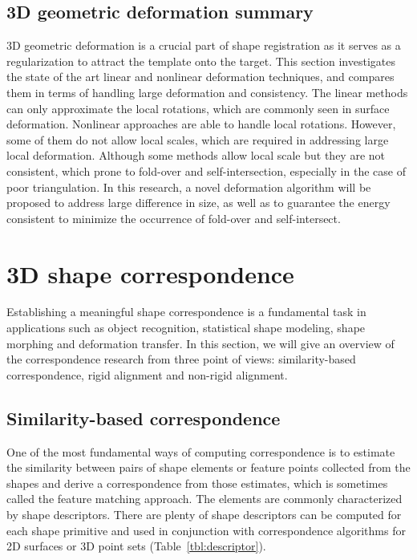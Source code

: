 \subsection{3D geometric deformation summary}
3D geometric deformation is a crucial part of shape registration as it serves as a regularization to attract the template onto the target. This section investigates the state of the art linear and nonlinear deformation techniques, and compares them in terms of handling large deformation and consistency. The linear methods can only approximate the local rotations, which are commonly seen in surface deformation. Nonlinear approaches are able to handle local rotations. However, some of them do not allow local scales, which are required in addressing large local deformation. Although some methods allow local scale but they are not consistent, which prone to fold-over and self-intersection, especially in the case of poor triangulation. In this research, a novel deformation algorithm will be proposed to address large difference in size, as well as to guarantee the energy consistent to minimize the occurrence of fold-over and self-intersect.



\section{3D shape correspondence}
Establishing a meaningful shape correspondence is a fundamental task in applications such as object recognition, statistical shape modeling, shape morphing and deformation transfer. In this section, we will give an overview of the correspondence research from three point of views: similarity-based correspondence, rigid alignment and non-rigid alignment.

\subsection{Similarity-based correspondence} One of the most fundamental ways of computing correspondence is to estimate the similarity between pairs of shape elements or feature points collected from the shapes and derive a correspondence from those estimates, which is sometimes called the feature matching approach. The elements are commonly characterized by shape descriptors. There are plenty of shape descriptors can be computed for each shape primitive and used in conjunction with correspondence algorithms for 2D surfaces or 3D point sets (Table~\ref{tbl:descriptor}).
 

